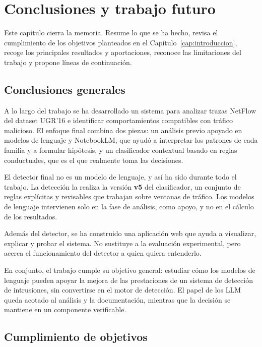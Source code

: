 \chapter{Conclusiones y trabajo futuro}
\label{cap:conclusiones}

Este capítulo cierra la memoria. Resume lo que se ha hecho, revisa el cumplimiento de los objetivos planteados en el Capítulo~\ref{cap:introduccion}, recoge los principales resultados y aportaciones, reconoce las limitaciones del trabajo y propone líneas de continuación.

\section{Conclusiones generales}
\label{sec:concl_resumen}

A lo largo del trabajo se ha desarrollado un sistema para analizar trazas NetFlow del dataset UGR'16 \cite{ugr16} e identificar comportamientos compatibles con tráfico malicioso. El enfoque final combina dos piezas: un análisis previo apoyado en modelos de lenguaje y NotebookLM, que ayudó a interpretar los patrones de cada familia y a formular hipótesis, y un clasificador contextual basado en reglas conductuales, que es el que realmente toma las decisiones.

El detector final no es un modelo de lenguaje, y así ha sido durante todo el trabajo. La detección la realiza la versión \textbf{v5} del clasificador, un conjunto de reglas explícitas y revisables que trabajan sobre ventanas de tráfico. Los modelos de lenguaje intervienen solo en la fase de análisis, como apoyo, y no en el cálculo de los resultados.

Además del detector, se ha construido una aplicación web que ayuda a visualizar, explicar y probar el sistema. No sustituye a la evaluación experimental, pero acerca el funcionamiento del detector a quien quiera entenderlo.

En conjunto, el trabajo cumple su objetivo general: estudiar cómo los modelos de lenguaje pueden apoyar la mejora de las prestaciones de un sistema de detección de intrusiones, sin convertirse en el motor de detección. El papel de los LLM queda acotado al análisis y la documentación, mientras que la decisión se mantiene en un componente verificable.

\section{Cumplimiento de objetivos}
\label{sec:concl_objetivos}

